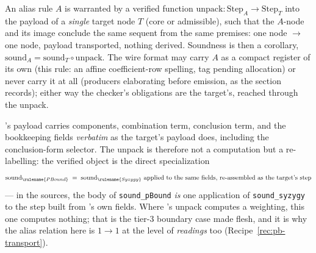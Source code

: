 

\begin{brecipe}\label{rec:pb-template}
An alias rule $A$ is warranted by a verified function
$\mathrm{unpack} : \mathrm{Step}_A \to \mathrm{Step}_T$ into the payload
of a \emph{single} target node $T$ (core or admissible), such that the
$A$-node and its image conclude the same sequent from the same premises:
one node $\to$ one node, payload transported, nothing derived. Soundness
is then a corollary, $\mathrm{sound}_A = \mathrm{sound}_T \circ
\mathrm{unpack}$. The wire format may carry $A$ as a compact register of
its own (this rule: an affine coefficient-row spelling, tag pending
allocation) or never carry it at all (producers elaborating before
emission, as the  section records); either way the
checker's obligations are the target's, reached through the unpack.
\end{brecipe}

\begin{brecipe}
\label{rec:pb-unpack}
's payload carries components, combination term,
conclusion term, and the bookkeeping fields \emph{verbatim} as the
target's payload does, including the conclusion-form selector. The
unpack is therefore not a computation but a re-labelling: the verified
object is the direct specialization
\[
\mathrm{sound}_{\rulename{PBound}}
\;=\;
\mathrm{sound}_{\rulename{Syzygy}}
\ \text{\upshape applied to the same fields, re-assembled as the
target's step}
\]
--- in the sources, the body of \texttt{sound\_pBound} \emph{is} one
application of \texttt{sound\_syzygy} to the step built from
's own fields. Where 's unpack
computes a weighting, this one computes nothing; that is the tier-3
boundary case made flesh, and it is why the alias relation here is
$1 \to 1$ at the level of \emph{readings} too
(Recipe~\ref{rec:pb-transport}).
\end{brecipe}

